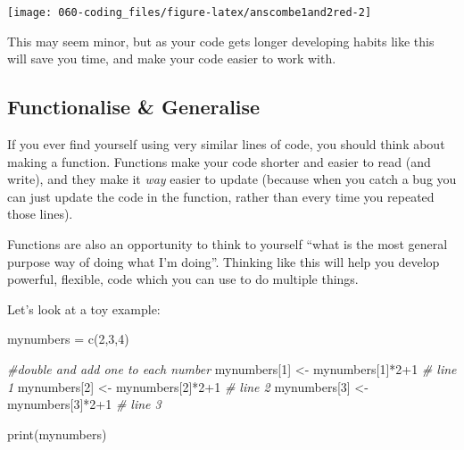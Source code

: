 \documentclass[
  12pt,
  a5paper,
]{book}
\newenvironment{Shaded}{\begin{snugshade}}{\end{snugshade}}
\newcommand{\CommentTok}[1]{\textcolor[rgb]{0.56,0.35,0.01}{\textit{#1}}}
\newcommand{\DecValTok}[1]{\textcolor[rgb]{0.00,0.00,0.81}{#1}}
\newcommand{\FunctionTok}[1]{\textcolor[rgb]{0.00,0.00,0.00}{#1}}
\newcommand{\NormalTok}[1]{#1}
\newcommand{\OtherTok}[1]{\textcolor[rgb]{0.56,0.35,0.01}{#1}}
\newcommand{\SpecialCharTok}[1]{\textcolor[rgb]{0.00,0.00,0.00}{#1}}
\begin{document}
\begin{center}\texttt{[image: 060-coding\_files/figure-latex/anscombe1and2red-2]} \end{center}

This may seem minor, but as your code gets longer developing habits like this will save you time, and make your code easier to work with.

\hypertarget{functionalise-generalise}{%
\subsection{Functionalise \& Generalise}\label{functionalise-generalise}}

If you ever find yourself using very similar lines of code, you should think about making a function. Functions make your code shorter and easier to read (and write), and they make it \emph{way} easier to update (because when you catch a bug you can just update the code in the function, rather than every time you repeated those lines).

Functions are also an opportunity to think to yourself ``what is the most general purpose way of doing what I'm doing''. Thinking like this will help you develop powerful, flexible, code which you can use to do multiple things.

Let's look at a toy example:

\begin{Shaded}
\begin{Highlighting}[]
\NormalTok{mynumbers }\OtherTok{=} \FunctionTok{c}\NormalTok{(}\DecValTok{2}\NormalTok{,}\DecValTok{3}\NormalTok{,}\DecValTok{4}\NormalTok{)}

\CommentTok{\#double and add one to each number}
\NormalTok{mynumbers[}\DecValTok{1}\NormalTok{] }\OtherTok{\textless{}{-}}\NormalTok{ mynumbers[}\DecValTok{1}\NormalTok{]}\SpecialCharTok{*}\DecValTok{2}\SpecialCharTok{+}\DecValTok{1} \CommentTok{\# line 1}
\NormalTok{mynumbers[}\DecValTok{2}\NormalTok{] }\OtherTok{\textless{}{-}}\NormalTok{ mynumbers[}\DecValTok{2}\NormalTok{]}\SpecialCharTok{*}\DecValTok{2}\SpecialCharTok{+}\DecValTok{1} \CommentTok{\# line 2}
\NormalTok{mynumbers[}\DecValTok{3}\NormalTok{] }\OtherTok{\textless{}{-}}\NormalTok{ mynumbers[}\DecValTok{3}\NormalTok{]}\SpecialCharTok{*}\DecValTok{2}\SpecialCharTok{+}\DecValTok{1} \CommentTok{\# line 3}

\FunctionTok{print}\NormalTok{(mynumbers)}
\end{Highlighting}
\end{Shaded}
\end{document}
